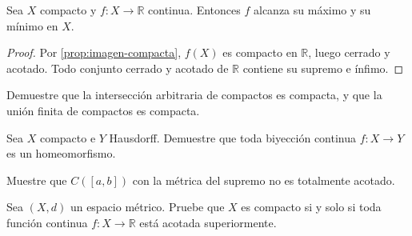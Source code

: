\begin{theorem}
\label{teo:max-min}
Sea $X$ compacto y $f\colon X\to\mathbb{R}$ continua. Entonces $f$ alcanza su máximo y su mínimo en $X$.
\end{theorem}
\begin{proof}
Por \cref{prop:imagen-compacta}, $f(X)$ es compacto en $\mathbb{R}$, luego cerrado y acotado. Todo conjunto cerrado y acotado de $\mathbb{R}$ contiene su supremo e ínfimo.
\end{proof}

\begin{exercise}
Demuestre que la intersección arbitraria de compactos es compacta, y que la unión finita de compactos es compacta.
\end{exercise}

\begin{exercise}
Sea $X$ compacto e $Y$ Hausdorff. Demuestre que toda biyección continua $f\colon X\to Y$ es un homeomorfismo.
\end{exercise}

\begin{exercise}
Muestre que $C([a,b])$ con la métrica del supremo no es totalmente acotado.
\end{exercise}

\begin{problem}
Sea $(X,d)$ un espacio métrico. Pruebe que $X$ es compacto si y solo si toda función continua $f\colon X\to\mathbb{R}$ está acotada superiormente.
\end{problem}
